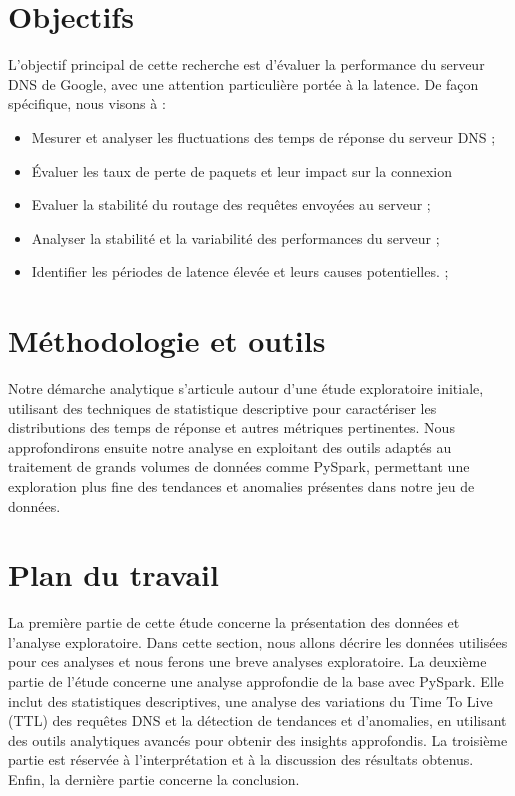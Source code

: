 \section*{Objectifs}
L'objectif principal de cette recherche est d'évaluer la performance du serveur DNS de Google, avec une attention particulière portée à la latence. De façon spécifique, nous visons à :
	\begin{itemize}
		\item Mesurer et analyser les fluctuations des temps de réponse du serveur DNS ;
		\item Évaluer les taux de perte de paquets et leur impact sur la connexion
		\item Evaluer la stabilité du routage des requêtes envoyées au serveur ;
		\item Analyser la stabilité et la variabilité des performances du serveur ;
		\item Identifier les périodes de latence élevée et leurs causes potentielles. ;
	\end{itemize}
	
\section*{Méthodologie et outils}
Notre démarche analytique s'articule autour d'une étude exploratoire initiale, utilisant des techniques de statistique descriptive pour caractériser les distributions des temps de réponse et autres métriques pertinentes. Nous approfondirons ensuite notre analyse en exploitant des outils adaptés au traitement de grands volumes de données comme PySpark, permettant une exploration plus fine des tendances et anomalies présentes dans notre jeu de données.

\vspace{0.4cm}
\section*{Plan du travail}
La première partie de cette étude concerne la présentation des données et l’analyse exploratoire. Dans cette section, nous allons décrire les données utilisées pour ces analyses et nous ferons  une breve analyses exploratoire. La deuxième partie de l'étude concerne une analyse approfondie de la base avec PySpark. Elle inclut  des statistiques descriptives, une analyse des variations du Time To Live (TTL) des requêtes DNS et la détection de tendances et d'anomalies, en utilisant des outils analytiques avancés pour obtenir des insights approfondis. La troisième partie est réservée à l’interprétation et à la discussion des résultats obtenus. Enfin, la dernière partie concerne la conclusion. 
\newpage
\chaptitle
\fancyhead[l]{}
\vspace{0.2cm}\vspace{-0.7cm}


